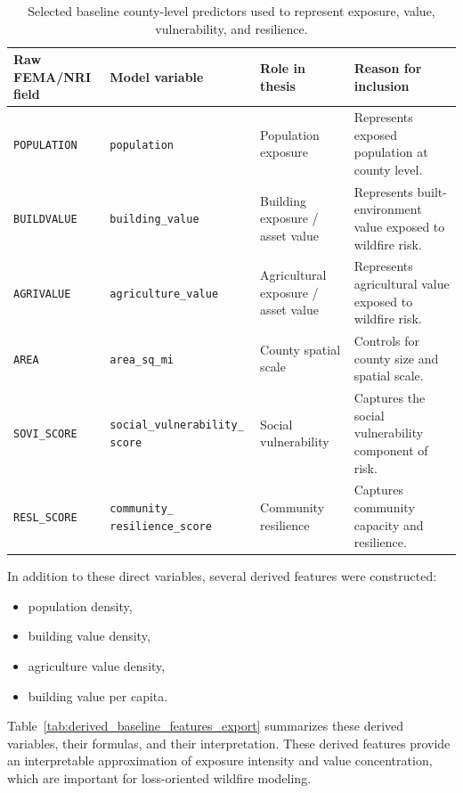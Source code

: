 \begin{table}[htbp]
    \centering
    \caption{Selected baseline county-level predictors used to represent exposure, value, vulnerability, and resilience.}
    \label{tab:selected_baseline_predictors_export}
    \scriptsize
    \setlength{\tabcolsep}{4pt}
    \begin{tabularx}{\textwidth}{>{\raggedright\arraybackslash}p{2.3cm} >{\raggedright\arraybackslash}p{3.0cm} >{\raggedright\arraybackslash}p{2.6cm} X}
    \toprule
    Raw FEMA/NRI field & Model variable & Role in thesis & Reason for inclusion \\
    \midrule
    \texttt{POPULATION} & \texttt{population} & Population exposure & Represents exposed population at county level. \\
    \texttt{BUILDVALUE} & \texttt{building\_value} & Building exposure / asset value & Represents built-environment value exposed to wildfire risk. \\
    \texttt{AGRIVALUE} & \texttt{agriculture\_value} & Agricultural exposure / asset value & Represents agricultural value exposed to wildfire risk. \\
    \texttt{AREA} & \texttt{area\_sq\_mi} & County spatial scale & Controls for county size and spatial scale. \\
    \texttt{SOVI\_SCORE} & \texttt{social\_vulnerability\_
    score} & Social vulnerability & Captures the social vulnerability component of risk. \\
    
    \texttt{RESL\_SCORE} & \texttt{community\_
    resilience\_score} & Community resilience & Captures community capacity and resilience. \\
    \bottomrule
    \end{tabularx}
\end{table}

In addition to these direct variables, several derived features were constructed:
\begin{itemize}
    \item population density,
    \item building value density,
    \item agriculture value density,
    \item building value per capita.
\end{itemize}

Table~\ref{tab:derived_baseline_features_export} summarizes these derived variables, their formulas, and their interpretation. These derived features provide an interpretable approximation of exposure intensity and value concentration, which are important for loss-oriented wildfire modeling.

